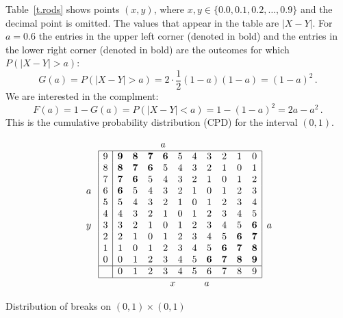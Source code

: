 Table~\ref{t.rods} shows points $(x,y)$, where $x,y \in \{0.0, 0.1, 0.2, \ldots, 0.9\}$ and the decimal point is omitted. The values that appear in the table are $|X-Y|$. For $a=0.6$ the entries in the upper left corner (denoted in bold) and the entries in the lower right corner (denoted in bold) are the outcomes for which $P(|X-Y|>a)$:
\[
G(a) = P(|X-Y|>a)=2\cdot \frac{1}{2}(1-a)(1-a)=(1-a)^2\,.
\]
We are interested in the complment:
\[
F(a)=1-G(a)=P(|X-Y|<a)=1-(1-a)^2=2a-a^2\,.
\]
This is the cumulative probability distribution (CPD) for the interval $(0,1)$. 
\begin{table}[bt]
\[
\begin{array}{c}
\quad\\\\\\
a\\\\
\quad\\
y\\
\quad\\\quad\\\quad\\\quad
\end{array}
\begin{array}{|c|cccccccccc|}
\multicolumn{11}{l}{\qquad \qquad \qquad a}\\
\hline
9& \mathbf{9} & \mathbf{8} & \mathbf{7} & \mathbf{6} & 5 & 4 & 3 & 2 & 1 & 0  \\
8& \mathbf{8} & \mathbf{7} & \mathbf{6} & 5 & 4 & 3 & 2 & 1 & 0 & 1  \\
7& \mathbf{7} & \mathbf{6} & 5 & 4 & 3 & 2 & 1 & 0 & 1 & 2  \\
6& \mathbf{6} & 5 & 4 & 3 & 2 & 1 & 0 & 1 & 2 & 3  \\
5& 5 & 4 & 3 & 2 & 1 & 0 & 1 & 2 & 3 & 4  \\
4& 4 & 3 & 2 & 1 & 0 & 1 & 2 & 3 & 4 & 5  \\
3& 3 & 2 & 1 & 0 & 1 & 2 & 3 & 4 & 5 & \mathbf{6}  \\
2& 2 & 1 & 0 & 1 & 2 & 3 & 4 & 5 & \mathbf{6} & \mathbf{7}  \\
1& 1 & 0 & 1 & 2 & 3 & 4 & 5 & \mathbf{6} & \mathbf{7} & \mathbf{8}  \\
0& 0 & 1 & 2 & 3 & 4 & 5 & \mathbf{6} & \mathbf{7} & \mathbf{8} & \mathbf{9}  \\
\hline
&0 & 1 & 2 & 3 & 4 & 5 & 6 & 7 & 8 & 9  \\
\hline
\multicolumn{11}{c}{\quad \quad x\quad\quad\quad a}
\end{array}
\begin{array}{c}
\\\\\\
a\\\\
\end{array}
\]
\caption{Distribution of breaks on $(0,1)\times (0,1)$}\label{t.rods}
\end{table}
